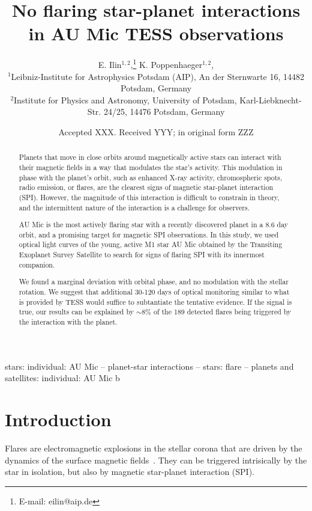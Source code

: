 \documentclass[fleqn,usenatbib,letters]{mnras}%
\title[]{No flaring star-planet interactions in AU Mic TESS observations}
\author[E. Ilin et al.]{
E. Ilin$^{1,2}$,\thanks{E-mail: eilin@aip.de}
K. Poppenhaeger$^{1,2}$,
\\
$^{1}$Leibniz-Institute for Astrophysics Potsdam (AIP), An der Sternwarte 16, 14482 Potsdam, Germany\\
$^{2}$Institute for Physics and Astronomy, University of Potsdam, Karl-Liebknecht-Str. 24/25, 14476 Potsdam, Germany
}
\date{Accepted XXX. Received YYY; in original form ZZZ}
\begin{document}
\label{firstpage}
\pagerange{\pageref{firstpage}--\pageref{lastpage}}
\maketitle

\begin{abstract}
Planets that move in close orbits around magnetically active stars can interact with their magnetic fields in a way that modulates the star's activity. This modulation in phase with the planet's orbit, such as enhanced X-ray activity, chromospheric spots, radio emission, or flares, are the clearest signs of magnetic star-planet interaction (SPI). However, the magnitude of this interaction is difficult to constrain in theory, and the intermittent nature of the interaction is a challenge for observers. 

AU Mic is the most actively flaring star with a recently discovered planet in a 8.6 day orbit, and a promising target for magnetic SPI observations. In this study, we used optical light curves of the young, active M1 star AU Mic obtained by the Transiting Exoplanet Survey Satellite to search for signs of flaring SPI with its innermost companion. 

We found a marginal deviation with orbital phase, and no modulation with the stellar rotation. We suggest that additional 30-120 days of optical monitoring similar to what is provided by TESS would suffice to subtantiate the tentative evidence. If the signal is true, our results can be explained by $\sim8\%$ of the 189 detected flares being triggered by the interaction with the planet. 
\end{abstract}

\begin{keywords}
stars: individual: AU Mic -- planet-star interactions -- stars: flare -- planets and satellites: individual: AU Mic b
\end{keywords}

%

\section{Introduction}

Flares are electromagnetic explosions in the stellar corona that are driven by the dynamics of the surface magnetic fields~\citep{benz2010}. They can be triggered intrisically by the star in isolation, but also by magnetic star-planet interaction (SPI).
\end{document}
